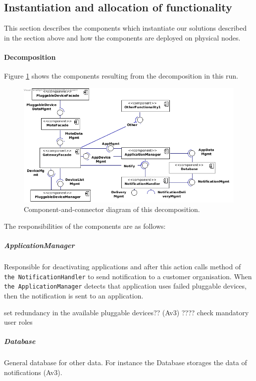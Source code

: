 \subsection{Instantiation and allocation of functionality}
    This section describes the components which instantiate our solutions described
    in the section above and how the components are deployed on physical nodes.

    \paragraph{Decomposition}
        Figure \ref{fig:it1-cc_main} shows the components resulting from the
        decomposition in this run.

        \begin{figure}[!htp]
        	\centering
        	\includegraphics[width=1.00\textwidth]{component-diagram-1}
        	\caption{Component-and-connector diagram of this decomposition.}
            \label{fig:it1-cc_main}
        \end{figure}

        \noindent The responsibilities of the components are as follows:

    \subparagraph{ApplicationManager}
        Responsible for deactivating applications and after this action calls method of
        \texttt{the NotificationHandler} to send notification to a customer organisation.
        When \texttt{the ApplicationManager} detects that application uses failed pluggable devices,
        then the notification is sent to an application.

        set redundancy in the available pluggable devices??
        (Av3) ???? check mandatory user roles

    \subparagraph{Database}
        General database for other data. For instance the Database storages the data
        of notifications (Av3).

